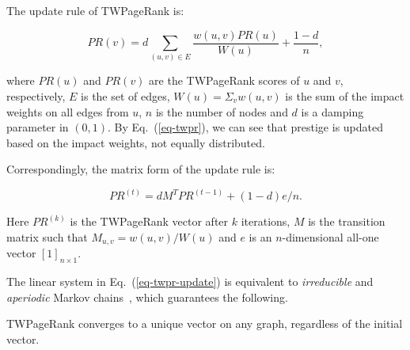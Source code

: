 The update rule of TWPageRank is:

\vspace{-1ex}
\begin{small}
\begin{equation}\label{eq-twpr}
PR(v)=d\sum_{(u,v)\in E} \frac{w(u,v)PR(u)}{W(u)}+\frac{1-d}{n},
\end{equation}
\end{small}
where $PR(u)$ and $PR(v)$ are the TWPageRank scores of $u$ and $v$, respectively, $E$ is the set of edges, $W(u)=\Sigma_{v} w(u,v)$ is the sum of the impact weights on all edges from $u$, $n$ is the number of nodes and $d$ is a damping parameter in $(0, 1)$. By Eq.~(\ref{eq-twpr}), we can see that prestige is updated based on the impact weights, not equally distributed.

Correspondingly, the matrix form of the update rule is:

\vspace{-1ex}
\begin{small}
\begin{equation}
\label{eq-twpr-update}
PR^{(t)}=d M^T  PR^{(t-1)} + (1-d) e/n.
\end{equation}
\end{small}
%
\noindent
Here $PR^{(k)}$ is the TWPageRank vector after $k$ iterations,  $M$ is the transition matrix such that $M_{u,v}=w(u,v)/W(u)$ and  $e$ is an $n$-dimensional all-one vector $[1]_{n\times1}$.

The linear system in Eq.~(\ref{eq-twpr-update}) is equivalent to {\em irreducible} and {\em aperiodic} Markov chains~\cite{CorsoGR05}, which guarantees the following.


\begin{prop}
\label{prop-converg}
TWPageRank converges to a unique  vector on any graph, regardless of the initial vector.
\end{prop}



